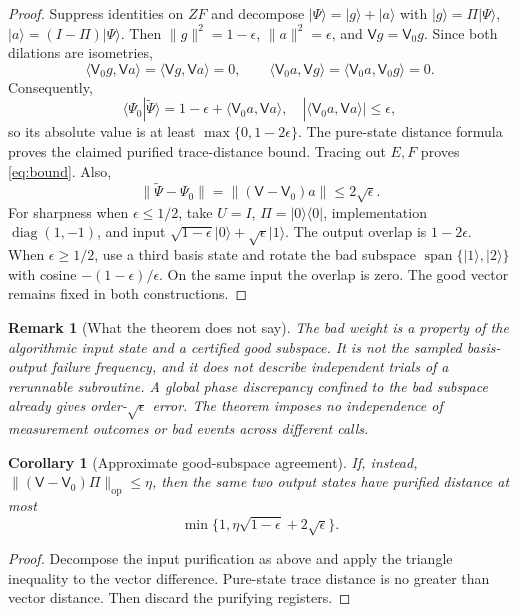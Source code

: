 \documentclass[11pt]{article}
\newtheorem{corollary}[theorem]{Corollary}
\newtheorem{remark}[theorem]{Remark}
\newcommand{\ket}[1]{\lvert #1\rangle}
\newcommand{\bra}[1]{\langle #1\rvert}
\newcommand{\VV}{\mathsf V}
\begin{document}
\begin{proof}
Suppress identities on $ZF$ and decompose $\ket\Psi=\ket g+\ket a$ with $\ket g=\Pi\ket\Psi$, $\ket a=(I-\Pi)\ket\Psi$. Then $\|g\|^2=1-\epsilon$, $\|a\|^2=\epsilon$, and $\VV g=\VV_0g$. Since both dilations are isometries,
\begin{equation}
 \langle\VV_0g,\VV a\rangle
 =\langle\VV g,\VV a\rangle=0,
 \qquad
 \langle\VV_0a,\VV g\rangle
 =\langle\VV_0a,\VV_0g\rangle=0.
\end{equation}
Consequently,
\begin{equation}
 \langle\Psi_0|\widetilde\Psi\rangle
 =1-\epsilon+\langle\VV_0a,\VV a\rangle,
 \quad |\langle\VV_0a,\VV a\rangle|\leq\epsilon,
\end{equation}
so its absolute value is at least $\max\{0,1-2\epsilon\}$. The pure-state distance formula proves the claimed purified trace-distance bound. Tracing out $E,F$ proves \eqref{eq:bound}. Also,
\begin{equation}
 \|\widetilde\Psi-\Psi_0\|
 =\|(\VV-\VV_0)a\|\leq2\sqrt\epsilon.
\end{equation}
For sharpness when $\epsilon\leq1/2$, take $U=I$, $\Pi=\ket0\bra0$, implementation $\operatorname{diag}(1,-1)$, and input $\sqrt{1-\epsilon}\ket0+\sqrt\epsilon\ket1$. The output overlap is $1-2\epsilon$. When $\epsilon\geq1/2$, use a third basis state and rotate the bad subspace $\operatorname{span}\{\ket1,\ket2\}$ with cosine $-(1-\epsilon)/\epsilon$. On the same input the overlap is zero. The good vector remains fixed in both constructions.
\end{proof}

\begin{remark}[What the theorem does not say]
The bad weight is a property of the algorithmic input state and a \emph{certified} good subspace. It is not the sampled basis-output failure frequency, and it does not describe independent trials of a rerunnable subroutine. A global phase discrepancy confined to the bad subspace already gives order-$\sqrt\epsilon$ error. The theorem imposes no independence of measurement outcomes or bad events across different calls.
\end{remark}

\begin{corollary}[Approximate good-subspace agreement]
If, instead, $\|(\VV-\VV_0)\Pi\|_{\mathrm{op}}\leq\eta$, then the same two output states have purified distance at most
\begin{equation}
 \min\{1,\eta\sqrt{1-\epsilon}+2\sqrt\epsilon\}.
\end{equation}
\end{corollary}
\begin{proof}
Decompose the input purification as above and apply the triangle inequality to the vector difference. Pure-state trace distance is no greater than vector distance. Then discard the purifying registers.
\end{proof}
\end{document}
